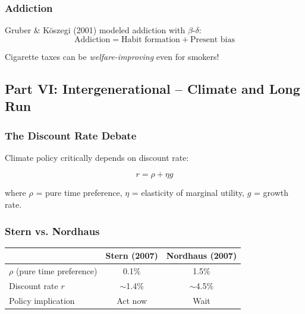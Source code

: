 \subsubsection{Addiction}

Gruber \& Köszegi (2001) modeled addiction with $\beta$-$\delta$:
\begin{equation}
\text{Addiction} = \text{Habit formation} + \text{Present bias}
\end{equation}

Cigarette taxes can be \textit{welfare-improving} even for smokers!

\subsection{Part VI: Intergenerational – Climate and Long Run}

\subsubsection{The Discount Rate Debate}

Climate policy critically depends on discount rate:

\begin{equation}
r = \rho + \eta g
\end{equation}

where $\rho$ = pure time preference, $\eta$ = elasticity of marginal utility, $g$ = growth rate.

\subsubsection{Stern vs. Nordhaus}

\begin{center}
\renewcommand{\arraystretch}{1.3}
\begin{tabular}{|l|c|c|}
\hline
& \textbf{Stern (2007)} & \textbf{Nordhaus (2007)} \\
\hline
$\rho$ (pure time preference) & 0.1\% & 1.5\% \\
Discount rate $r$ & $\sim$1.4\% & $\sim$4.5\% \\
Policy implication & Act now & Wait \\
\hline
\end{tabular}
\end{center}

